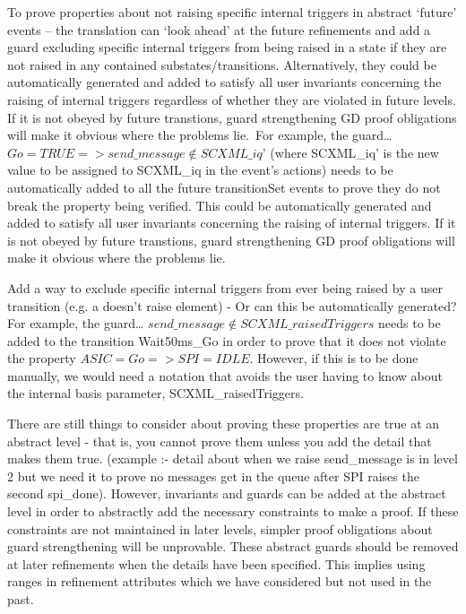 To prove properties about not raising specific internal triggers in abstract `future' events – the translation can `look ahead' at the future refinements and add a guard excluding specific internal triggers from being raised in a state if they are not raised in any contained substates/transitions. Alternatively, they could be automatically generated and added to satisfy all user invariants concerning the raising of internal triggers regardless of whether they are violated in future levels. If it is not obeyed by future transtions, guard strengthening GD proof obligations will make it obvious where the problems lie. For example, the guard… 
     $Go = TRUE => send\_message \notin SCXML\_iq’$	
     (where SCXML\_iq’ is the new value to be assigned to SCXML\_iq in the event’s actions)
needs to be automatically added to all the future transitionSet events to prove they do not break the property being verified. This could be automatically generated and added to satisfy all user invariants concerning the raising of internal triggers. If it is not obeyed by future transtions, guard strengthening GD proof obligations will make it obvious where the problems lie.

Add a way to exclude specific internal triggers from ever being raised by a user transition (e.g. a doesn't raise element) - Or can this be automatically generated? For example, the guard… 
     $send\_message ∉ SCXML\_raisedTriggers$
needs to be added to the transition Wait50ms\_Go in order to prove that it does not violate the property $ASIC=Go => SPI=IDLE$. However, if this is to be done manually, we would need a notation that avoids the user having to know about the internal basis parameter, SCXML\_raisedTriggers.

There are still things to consider about proving these properties are true at an abstract level - that is, you cannot prove them unless you add the detail that makes them true. (example :- detail about when we raise send\_message is in level 2 but we need it to prove no messages get in the queue after SPI raises the second spi\_done). However, invariants and guards can be added at the abstract level in order to abstractly add the necessary constraints to make a proof. If these constraints are not maintained in later levels, simpler proof obligations about guard strengthening will be unprovable. These abstract guards should be removed at later refinements when the details have been specified. This implies using ranges in refinement attributes which we have considered but not used in the past.

